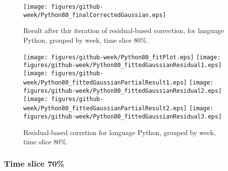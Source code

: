 \begin{figure}[]
\centering
{\texttt{[image: figures/github-week/Python80\_finalCorrectedGaussian.eps]}}
\caption{Result after thir iteration of residual-based correction, for language Python, grouped by week, time slice 80\%.}
\end{figure}


\begin{figure}[hb]
\centering
{}
{\texttt{[image: figures/github-week/Python80\_fitPlot.eps]}}
{\texttt{[image: figures/github-week/Python80\_fittedGaussianResidual1.eps]}}
{\texttt{[image: figures/github-week/Python80\_fittedGaussianPartialResult1.eps]}}
{\texttt{[image: figures/github-week/Python80\_fittedGaussianResidual2.eps]}}
{\texttt{[image: figures/github-week/Python80\_fittedGaussianPartialResult2.eps]}}
{\texttt{[image: figures/github-week/Python80\_fittedGaussianResidual3.eps]}}
\caption{Residual-based corretion for language Python, grouped by week, time slice 80\%.}
\end{figure}


\clearpage 
\newpage 


\FloatBarrier

\subsubsection{Time slice 70\%}

